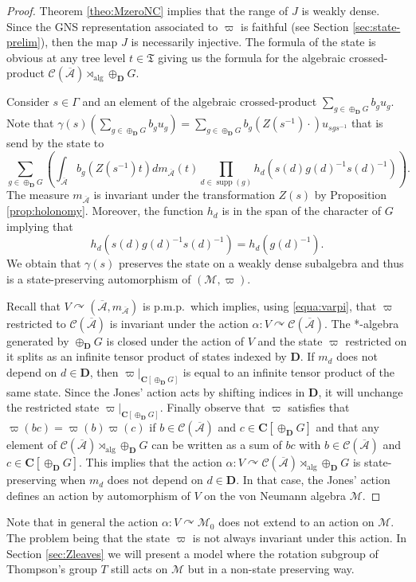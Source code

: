 \documentclass[a4paper,12pt]{amsart}
\numberwithin{equation}{section}
\theoremstyle{definition}
\newcommand{\act}{\curvearrowright}
\newcommand{\al}{\alpha}
\newcommand{\oscrA}{{\overline{\mathscr{A}}}}
\DeclareMathOperator{\alg}{alg}
\newcommand{\scrC}{\mathscr C}
\newcommand{\C}{\mathbf C}
\newcommand{\D}{\mathbf D}
\newcommand{\ga}{\gamma}
\newcommand{\Ga}{\Gamma}
\newcommand{\Gd}{\oplus_\D G}
\newcommand{\scrM}{\mathscr M}
\DeclareMathOperator{\supp}{supp}
\newcommand{\fT}{\mathfrak T}
\begin{document}
\begin{proof}
Theorem \ref{theo:MzeroNC} implies that the range of $J$ is weakly dense.
Since the GNS representation associated to $\varpi$ is faithful (see Section \ref{sec:state-prelim}), then the map $J$ is necessarily injective.
The formula of the state is obvious at any tree level $t\in\fT$ giving us the formula for the algebraic crossed-product $\scrC(\oscrA)\rtimes_{\alg} \oplus_\D G$.

Consider $s\in\Ga$ and an element of the algebraic crossed-product $\sum_{g\in \Gd} b_g u_g$.
Note that $\ga(s) \left( \sum_{g\in \Gd} b_g u_g \right) = \sum_{g\in \Gd} b_g(Z(s^{-1}) \cdot )  u_{sgs^{-1}}$ that is send by the state to
$$\sum_{g\in \Gd} \left(\int_\oscrA b_g(Z(s^{-1}) t) d m_\oscrA(t) \prod_{d\in\supp(g)} h_d(s(d)g(d)^{-1} s(d)^{-1}) \right).$$
The measure $m_\oscrA$ is invariant under the transformation $Z(s)$ by Proposition \ref{prop:holonomy}.
Moreover, the function $h_d$ is in the span of the character of $G$ implying that 
$$h_d(s(d)g(d)^{-1} s(d)^{-1}) = h_d(g(d)^{-1}).$$
We obtain that $\ga(s)$ preserves the state on a weakly dense subalgebra and thus is a state-preserving automorphism of $(\scrM,\varpi).$

Recall that $V\act (\oscrA,m_\oscrA)$ is p.m.p.~which implies, using \eqref{equa:varpi}, that $\varpi$ restricted to $\scrC(\oscrA)$ is invariant under the action $\al:V\act \scrC(\oscrA)$.
The *-algebra generated by $\Gd$ is closed under the action of $V$ and the state $\varpi$ restricted on it splits as an infinite tensor product of states indexed by $\D$.
If $m_d$ does not depend on $d\in\D$, then $\varpi|_{ \C[\Gd]}$ is equal to an infinite tensor product of the same state. 
Since the Jones' action acts by shifting indices in $\D$, it will unchange the restricted state $\varpi|_{\C[\Gd]}$.
Finally observe that $\varpi$ satisfies that $\varpi(bc) = \varpi(b)\varpi(c)$ if $b\in \scrC(\oscrA)$ and $c\in \C[\Gd]$ and that any element of $\scrC(\oscrA)\rtimes_{\alg} \Gd$ can be written as a sum of $bc$ with $b\in\scrC(\oscrA)$ and $c\in \C[\Gd].$ 
This implies that the action $\al:V\act \scrC(\oscrA)\rtimes_{\alg} \Gd$ is state-preserving when $m_d$ does not depend on $d\in\D$.
In that case, the Jones' action defines an action by automorphism of $V$ on the von Neumann algebra $\scrM$.
\end{proof}

Note that in general the action $\al:V\act \scrM_0$ does not extend to an action on $\scrM$.
The problem being that the state $\varpi$ is not always invariant under this action.
In Section \ref{sec:Zleaves} we will present a model where the rotation subgroup of Thompson's group $T$ still acts on $\scrM$ but in a non-state preserving way.
\end{document}

